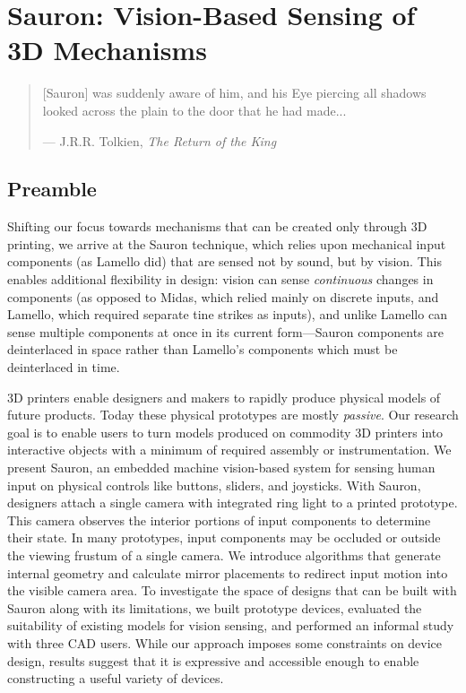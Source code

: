 \chapter{Sauron: Vision-Based Sensing of 3D Mechanisms}

\begin{quote}
[Sauron] was suddenly aware of him, and his Eye piercing all shadows looked across the plain to the door that he had made...

--- J.R.R. Tolkien, \emph{The Return of the King}
\end{quote}

\section{Preamble}

Shifting our focus towards mechanisms that can be created only through 3D printing, we arrive at the Sauron technique, which relies upon mechanical input components (as Lamello did) that are sensed not by sound, but by vision. This enables additional flexibility in design: vision can sense \emph{continuous} changes in components (as opposed to Midas, which relied mainly on discrete inputs, and Lamello, which required separate tine strikes as inputs), and unlike Lamello can sense multiple components at once in its current form---Sauron components are deinterlaced in space rather than Lamello's components which must be deinterlaced in time.

3D printers enable designers and makers to rapidly produce physical models of future products. Today these physical prototypes are mostly {\em passive}. Our research goal is to enable users to turn models produced on commodity 3D printers into interactive objects with a minimum of required assembly or instrumentation. We present Sauron, an embedded machine vision-based system for sensing human input on physical controls like buttons, sliders, and joysticks. With Sauron, designers attach a single camera with integrated ring light to a printed prototype. This camera observes the interior portions of input components to determine their state. In many prototypes, input components may be occluded or outside the viewing frustum of a single camera. We introduce algorithms that generate internal geometry and calculate mirror placements to redirect input motion into the visible camera area.   
To investigate the space of designs that can be built with Sauron along with its limitations, we built prototype devices, evaluated the suitability of existing models for vision sensing, and performed an informal study with three CAD users. While our approach imposes some constraints on device design, results suggest that it is expressive and accessible enough to enable constructing a useful variety of devices.

